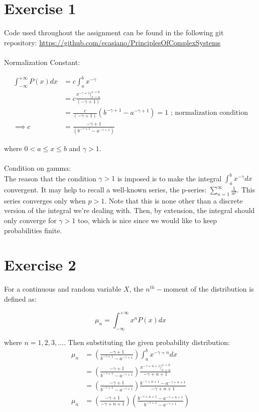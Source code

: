 \documentclass{article}
\begin{document}
\section{Exercise 1}

Code used throughout the assignment can be found in the following git repository: \url{https://github.com/ecasiano/PrinciplesOfComplexSystems} \\
\\
Normalization Constant:

\[
\begin{aligned}
\int_{-\infty}^{+\infty} P(x) dx &= c \int_{a}^{b} x^{-\gamma} \\
&= c \frac{x^{-\gamma + 1} \vert_{x=a}^{x=b} }{ (-\gamma + 1)} \\
&= \frac{c}{(-\gamma + 1)} (b^{-\gamma+1} - a^{-\gamma+1}) = 1 \text{ ; normalization condition} \\ 
\implies c &= \frac{-\gamma+1}{(b^{-\gamma+1} - a^{-\gamma+1})}
\end{aligned}
\]

where $0 < a \leq x \leq b$ and $\gamma > 1$. \\
\\
Condition on gamma: \\

The reason that the condition $\gamma > 1$ is imposed is to make the integral $\int_{a}^{b} x^{-\gamma} dx$ convergent. It may help to recall a well-known series, the p-series: $\sum_{n=1}^{\infty} \frac{1}{n^p}$. This series converges only when $p>1$. Note that this is none other than a discrete version of the integral we're dealing with. Then, by extension, the integral should only converge for $\gamma > 1$ too, which is nice since we would like to keep probabilities finite.
 
 \section{Exercise 2}

For a continuous and random variable $X$, the $n^{th}-$moment of the distribution is defined as:

\[ \mu_{n} = \int_{-\infty}^{+\infty} x^n P(x) dx\]

where $n = 1,2,3,...$. Then substituting the given probability distribution:
\[
\begin{aligned}
\mu_{n} &= (\frac{-\gamma+1}{b^{-\gamma+1} - a^{-\gamma+1}}) \int_{a}^{b} x^{-\gamma+n} dx \\
&= (\frac{-\gamma+1}{b^{-\gamma+1} - a^{-\gamma+1}}) \frac{x^{-\gamma+n+1}\vert_{x=a}^{x=b}}{-\gamma+n+1} \\
&= (\frac{-\gamma+1}{b^{-\gamma+1} - a^{-\gamma+1}}) \frac{b^{-\gamma+n+1} - a^{-\gamma+n+1}}{-\gamma+n+1} \\
\mu_n &= (\frac{-\gamma+1}{-\gamma+n+1}) (  \frac{b^{-\gamma+n+1} - a^{-\gamma+n+1}}{b^{-\gamma+1} - a^{-\gamma+1}}    )
\end{aligned}
\]
\end{document}
